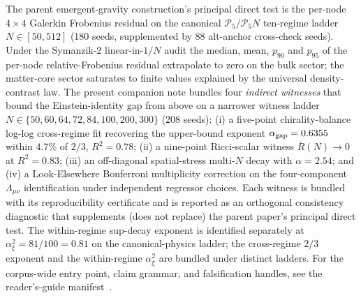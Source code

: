 
The parent emergent-gravity construction's principal direct test
is the per-node $4\!\times\!4$ Galerkin Frobenius residual on the
canonical $\mathcal P_{5}/\mathcal P_{5}N$ ten-regime ladder
$N\!\in\![50,512]$ (180 seeds, supplemented by 88 alt-anchor
cross-check seeds). Under the Symanzik-$2$ linear-in-$1/N$ audit
the median, mean, $p_{90}$ and $p_{95}$ of the per-node
relative-Frobenius residual extrapolate to zero on the bulk
sector; the matter-core sector saturates to finite values
explained by the universal density-contrast law. The present
companion note bundles four \emph{indirect witnesses} that bound
the Einstein-identity gap from above on a narrower witness
ladder $N\!\in\!\{50,60,64,72,84,100,200,300\}$ (208 seeds): (i)
a five-point chirality-balance log-log cross-regime fit
recovering the upper-bound exponent $\alpha_{\rm gap}=0.6355$
within $4.7\%$ of $2/3$, $R^{2}=0.78$; (ii) a nine-point
Ricci-scalar witness $\bar R(N)\!\to\!0$ at $R^{2}=0.83$; (iii)
an off-diagonal spatial-stress multi-$N$ decay with $\alpha=2.54$;
and (iv) a Look-Elsewhere Bonferroni multiplicity correction on
the four-component $\Lambda_{\mu\nu}$ identification under
independent regressor choices. Each witness is bundled with its
reproducibility certificate and is reported as an orthogonal
consistency diagnostic that supplements (does not replace) the
parent paper's principal direct test. The within-regime sup-decay
exponent is identified separately at $\alpha_{\xi}^{2}=81/100=0.81$
on the canonical-physics ladder; the cross-regime $2/3$ exponent
and the within-regime $\alpha_{\xi}^{2}$ are bundled under
distinct ladders. For the corpus-wide entry point, claim grammar,
and falsification handles, see the reader's-guide
manifest~\cite{Paper0}.
